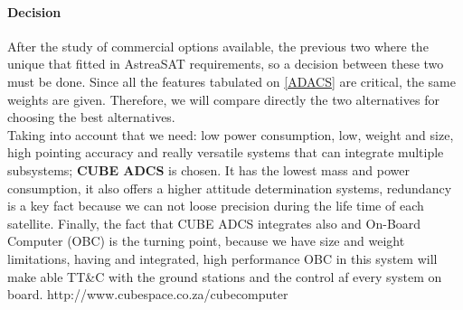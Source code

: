 \paragraph{Decision}  After the study of commercial options available, the previous two where the unique that fitted in AstreaSAT requirements, so a decision between these two must be done. Since all the features tabulated on \ref{ADACS} are critical, the same weights are given. Therefore, we will compare directly the two alternatives for choosing the best alternatives.\\
Taking into account that we need: low power consumption, low, weight and size, high pointing accuracy and really versatile systems that can integrate multiple subsystems; \textbf{CUBE ADCS} is chosen. It has the lowest mass and power consumption, it also offers a higher attitude determination systems, redundancy is a  key fact because we can not loose precision during the life time of each satellite. Finally, the fact that CUBE ADCS integrates also and On-Board Computer (OBC) is the turning point, because we have size and weight limitations, having and integrated, high performance OBC in this system will make able TT\&C with the ground stations and the control af every system on board.
http://www.cubespace.co.za/cubecomputer
